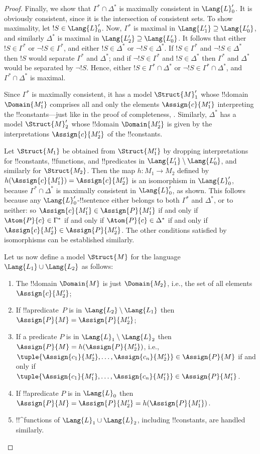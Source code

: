 \documentclass[../../include/open-logic-section]{subfiles}
\begin{document}
\begin{proof}
Finally, we show that $\Gamma^* \cap \Delta^*$ is maximally consistent
in $\Lang{L}'_0$. It is obviously consistent, since it is the
intersection of consistent sets. To show maximality, let $!S \in
\Lang{L}'_0$. Now, $\Gamma^*$ is maximal in $\Lang{L'_1}
\supseteq \Lang{L'_0}$, and similarly $\Delta^*$ is maximal in
$\Lang{L'_2} \supseteq \Lang{L'_0}$. It follows that either
$!S \in \Gamma^*$ or $\lnot !S \in \Gamma^*$, and either
$!S \in \Delta^*$ or $\lnot !S \in \Delta^*$. If $!S \in
\Gamma^*$ and $\lnot !S \in \Delta^*$ then $!S$ would
separate $\Gamma^*$ and $\Delta^*$; and if $\lnot !S \in
\Gamma^*$ and $!S \in \Delta^*$ then $\Gamma^*$ and $\Delta^*$
would be separated by $\lnot !S$. Hence, either $!S \in
\Gamma^* \cap \Delta^*$ or $\lnot !S \in \Gamma^* \cap \Delta^*$,
and $\Gamma^* \cap \Delta^*$ is maximal. 

Since $\Gamma^*$ is maximally consistent, it has a model
$\Struct{M}'_1$ whose !!{domain} $\Domain{M'_1}$ comprises all and
only the elements $\Assign{c}{M'_1}$ interpreting the
!!{constant}s---just like in the proof of completeness,
. Similarly, $\Delta^*$ has a
model $\Struct{M}'_2$ whose !!{domain} $\Domain{M'_2}$ is given by the
interpretations $\Assign{c}{M'_2}$ of the !!{constant}s.

Let $\Struct{M_1}$ be obtained from $\Struct{M'_1}$ by dropping
interpretations for !!{constant}s, !!{function}s, and !!{predicate}s in
$\Lang{L'_1} \setminus \Lang{L'_0}$, and similarly for
$\Struct{M_2}$. Then the map $h \colon M_1 \to M_2$ defined by
$h(\Assign{c}{M'_1}) = \Assign{c}{M'_2}$ is an
isomorphism in $\Lang{L}'_0$, because $\Gamma^* \cap \Delta^*$ is
maximally consistent in $\Lang{L}'_0$, as shown. This follows
because any $\Lang{L}'_0$-!!{sentence} either belongs to both
$\Gamma^*$ and $\Delta^*$, or to neither: so $\Assign{c}{M'_1} \in
\Assign{P}{M'_1}$ if and only if $\Atom{P}{c} \in \Gamma^*$ if and only if
$\Atom{P}{c} \in \Delta^*$ if and only if $\Assign{c}{M'_2} \in
\Assign{P}{M'_2}$. The other conditions satisfied by isomorphisms
can be established similarly.

Let us now define a model $\Struct{M}$ for the language
$\Lang{L_1} \cup \Lang{L_2}$ as follows:
\begin{enumerate}
\item The !!{domain} $\Domain{M}$ is just $\Domain{M_2}$, i.e., the
  set of all elements $\Assign{c}{M'_2}$; 
\item If !!a{predicate}~$P$ is in $\Lang{L_2} \setminus
  \Lang{L_1}$ then $\Assign{P}{M} = \Assign{P}{M'_2}$;
\item If a predicate $P$ is in $\Lang{L}_1\setminus \Lang{L}_2$ then
  $\Assign{P}{M} = h(\Assign{P}{M'_2})$, i.e.,
  $\tuple{\Assign{c_1}{M'_2}, \dots, \Assign{c_n}{M'_2}} \in
  \Assign{P}{M}$ if and only if $\tuple{\Assign{c_1}{M'_1}, \dots,
  \Assign{c_n}{M'_1}} \in \Assign{P}{M'_1}$.
\item If !!a{predicate} $P$ is in $\Lang{L}_0$ then $\Assign{P}{M} =
  \Assign{P}{M'_2} = h(\Assign{P}{M'_1})$. 
\item !!^{function}s of $\Lang{L}_1 \cup \Lang{L}_2$, including
  !!{constant}s, are handled similarly.
\end{enumerate}


\end{proof}
\end{document}
